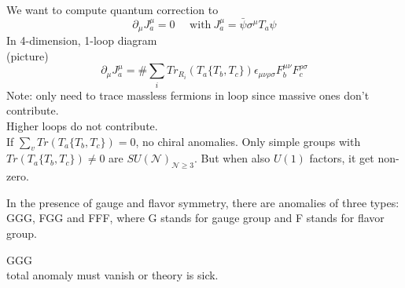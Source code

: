 \documentclass[type = bachelor]{fduthesis-en}
\begin{document}
We want to compute quantum correction to 
\begin{equation}
\partial_\mu J^\mu_a=0\ \ \ \ \ \ \mathrm{with}\ J_a^\mu=\bar{\psi}\sigma^\mu T_a\psi 
\end{equation}
In 4-dimension, 1-loop diagram\\
(picture)\\
\begin{equation}
\partial_\mu J^\mu_a=\#\sum_iTr_{R_i}(T_a\{T_b,T_c\})\epsilon_{\mu\nu\rho\sigma}F_b^{\mu\nu}F_c^{\rho\sigma}
\end{equation}
Note: only need to trace massless fermions in loop since massive ones don't contribute.\\
Higher loops do not contribute.\\
If $\sum_vTr(T_a\{T_b,T_c\})=0$, no chiral anomalies. Only simple groups with $Tr(T_a\{T_b,T_c\})\neq0$ are $SU(\mathcal{N})_{\mathcal{N}\geq3}$. But when also $U(1)$ factors, it get non-zero.

In the presence of gauge and flavor symmetry, there are anomalies of three types: GGG, FGG and FFF, where G stands for gauge group and F stands for flavor group.

GGG\\
total anomaly must vanish or theory is sick.
\end{document}
